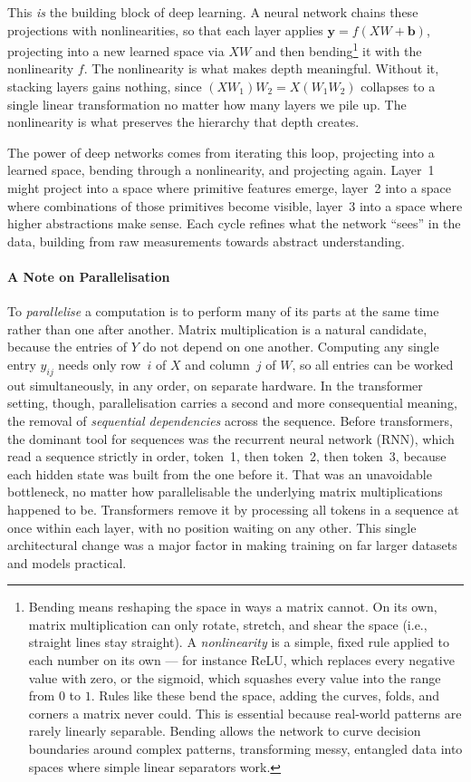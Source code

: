 \documentclass[11pt]{article}
\begin{document}
This \textit{is} the building block of deep learning. A neural network chains
these projections with nonlinearities, so that each layer applies
$\mathbf{y} = f(XW + \mathbf{b})$, projecting into a new learned space via $XW$
and then bending\footnote{%
Bending means reshaping the space in ways a matrix cannot. On its own, matrix
multiplication can only rotate, stretch, and shear the space (i.e., straight lines
stay straight). A \emph{nonlinearity} is a simple, fixed rule applied to each
number on its own --- for instance ReLU, which replaces every negative value
with zero, or the sigmoid, which squashes every value into the range from $0$ to
$1$. Rules like these bend the space, adding the curves, folds, and corners a
matrix never could. This is essential because real-world patterns are rarely linearly separable. Bending allows the network to curve decision boundaries around complex patterns, transforming messy, entangled data into spaces where simple linear separators work.} it with the nonlinearity $f$. The nonlinearity is what
makes depth meaningful. Without it, stacking layers gains nothing, since
$(XW_1)W_2 = X(W_1 W_2)$ collapses to a single linear transformation no matter
how many layers we pile up. The nonlinearity is what preserves the hierarchy
that depth creates.

The power of deep networks comes from iterating this loop, projecting into a
learned space, bending through a nonlinearity, and projecting again. Layer~1
might project into a space where primitive features emerge, layer~2 into a space
where combinations of those primitives become visible, layer~3 into a space
where higher abstractions make sense. Each cycle refines what the network
``sees'' in the data, building from raw measurements towards abstract
understanding.

\paragraph{A Note on Parallelisation} To \textit{parallelise} a computation is to perform many of its parts at the same time rather than one after another. Matrix multiplication is a natural candidate, because the entries of $Y$ do not depend on one another. Computing any single entry $y_{ij}$ needs only row~$i$ of $X$ and column~$j$ of $W$, so all entries can be worked out simultaneously, in any order, on separate hardware. In the transformer setting, though, parallelisation carries a second and more consequential meaning, the removal of \textit{sequential dependencies} across the sequence. Before transformers, the dominant tool for sequences was the recurrent neural network (RNN), which read a sequence strictly in order, token~1, then token~2, then token~3, because each hidden state was built from the one before it. That was an unavoidable bottleneck, no matter how parallelisable the underlying matrix multiplications happened to be. Transformers remove it by processing all tokens in a sequence at once within each layer, with no position waiting on any other. This single architectural change was a major factor in making training on far larger datasets and models practical.
\end{document}
